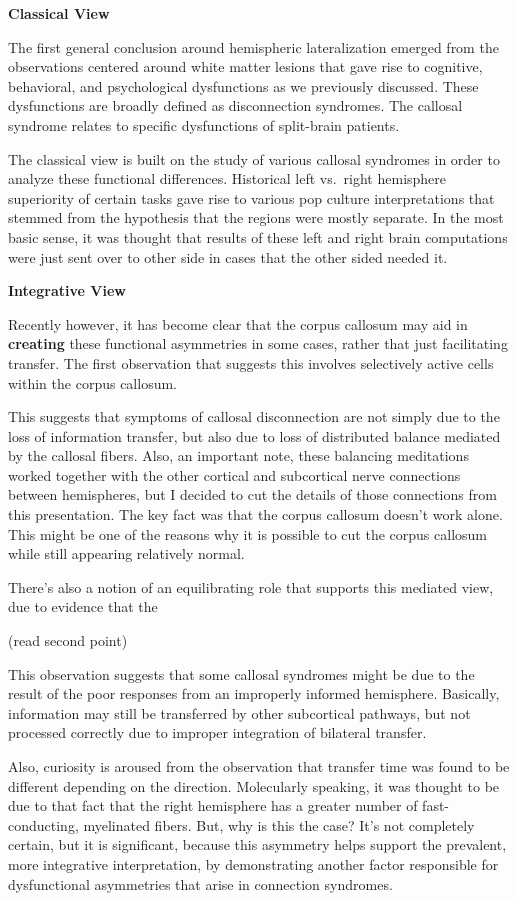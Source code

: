 \documentclass[basic]{inVerba-notes}
\begin{document}
\textbf{Classical View}

The first general conclusion around hemispheric lateralization emerged from the observations centered around white matter lesions that gave rise to cognitive, behavioral, and psychological dysfunctions as we previously discussed. These dysfunctions are broadly defined as disconnection syndromes. The callosal syndrome relates to specific dysfunctions of split-brain patients. 

The classical view is built on the study of various callosal syndromes in order to analyze these functional differences. Historical left vs.\ right hemisphere superiority of certain tasks gave rise to various pop culture interpretations that stemmed from the hypothesis that the regions were mostly separate. In the most basic sense, it was thought that results of these left and right brain computations were just sent over to other side in cases that the other sided needed it. 

\textbf{Integrative View}

Recently however, it has become clear that the corpus callosum may aid in \textbf{creating} these functional asymmetries in some cases, rather that just facilitating transfer. The first observation that suggests this involves selectively active cells within the corpus callosum. 

This suggests that symptoms of callosal disconnection are not simply due to the loss of information transfer, but also due to loss of distributed balance mediated by the callosal fibers. Also, an important note, these balancing meditations worked together with the other cortical and subcortical nerve connections between hemispheres, but I decided to cut the details of those connections from this presentation. The key fact was that the corpus callosum doesn't work alone. This might be one of the reasons why it is possible to cut the corpus callosum while still appearing relatively normal. 

There's also a notion of an equilibrating role that supports this mediated view, due to evidence that the

(read second point)

This observation suggests that some callosal syndromes might be due to the result of the poor responses from an improperly informed hemisphere. Basically, information may still be transferred by other subcortical pathways, but not processed correctly due to improper integration of bilateral transfer. 

Also, curiosity is aroused from the observation that transfer time was found to be different depending on the direction. Molecularly speaking, it was thought to be due to that fact that the right hemisphere has a greater number of fast-conducting, myelinated fibers. But, why is this the case? It's not completely certain, but it is significant, because this asymmetry helps support the prevalent, more integrative interpretation, by demonstrating another factor responsible for dysfunctional asymmetries that arise in connection syndromes. 
\end{document}

